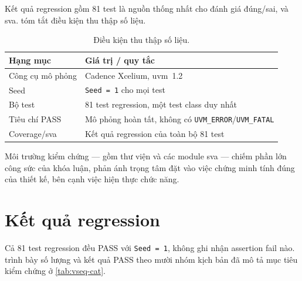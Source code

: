 Kết quả regression gồm 81 test là nguồn thống nhất cho đánh giá đúng/sai, \FunctionalCoverage{} và \gls{sva}.
 tóm tắt điều kiện thu thập số liệu.

\begin{table}[!htbp]
	\centering
	\caption{Điều kiện thu thập số liệu.}
	\label{tab:res-baseline}
	\begin{tabular}{L{4.6cm} L{8.7cm}}
		\toprule
		\textbf{Hạng mục}  & \textbf{Giá trị / quy tắc}                                          \\
		\midrule
		Công cụ mô phỏng   & Cadence Xcelium, \gls{uvm}~1.2                                      \\
		Seed               & \texttt{Seed = 1} cho mọi test                                      \\
		Bộ test            & 81 test regression, một test class duy nhất                         \\
		Tiêu chí PASS      & Mô phỏng hoàn tất, không có \texttt{UVM\_ERROR}/\texttt{UVM\_FATAL} \\
		Coverage/\gls{sva} & Kết quả regression của toàn bộ 81 test                              \\
		\bottomrule
	\end{tabular}
\end{table}

Môi trường kiểm chứng --- gồm thư viện \VirtualSequence{} và các module \gls{sva} --- chiếm
phần lớn công sức của khóa luận, phản ánh trọng tâm đặt vào việc chứng minh tính đúng của thiết kế,
bên cạnh việc hiện thực chức năng.

\section{Kết quả regression}
\label{sec:res-regression}

Cả 81 test regression đều PASS với \texttt{Seed = 1}, không ghi nhận assertion fail nào.
 trình bày số lượng và kết quả PASS theo mười nhóm kịch bản đã mô tả mục
tiêu kiểm chứng ở \cref{tab:vseq-cat}.

